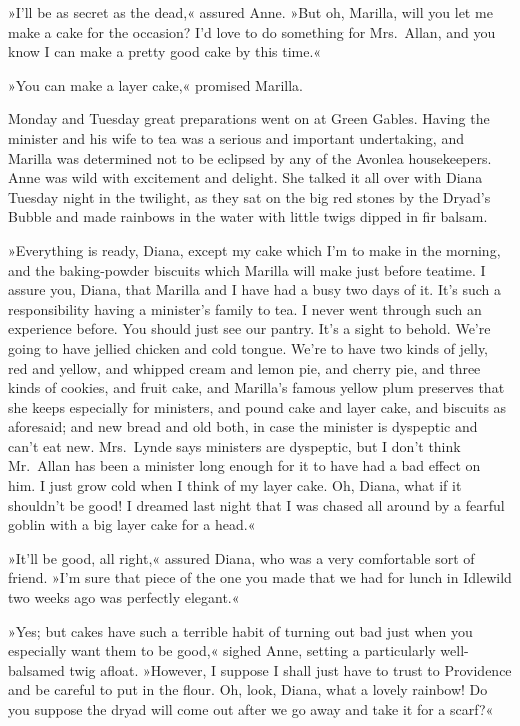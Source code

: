 »I'll be as secret as the dead,« assured Anne. »But oh, Marilla, will you let me make a cake for the occasion? I'd love to do something for Mrs.~Allan, and you know I can make a pretty good cake by this time.«

»You can make a layer cake,« promised Marilla.

Monday and Tuesday great preparations went on at Green Gables. Having the minister and his wife to tea was a serious and important undertaking, and Marilla was determined not to be eclipsed by any of the Avonlea housekeepers. Anne was wild with excitement and delight. She talked it all over with Diana Tuesday night in the twilight, as they sat on the big red stones by the Dryad's Bubble and made rainbows in the water with little twigs dipped in fir balsam.

»Everything is ready, Diana, except my cake which I'm to make in the morning, and the baking-powder biscuits which Marilla will make just before teatime. I assure you, Diana, that Marilla and I have had a busy two days of it. It's such a responsibility having a minister's family to tea. I never went through such an experience before. You should just see our pantry. It's a sight to behold. We're going to have jellied chicken and cold tongue. We're to have two kinds of jelly, red and yellow, and whipped cream and lemon pie, and cherry pie, and three kinds of cookies, and fruit cake, and Marilla's famous yellow plum preserves that she keeps especially for ministers, and pound cake and layer cake, and biscuits as aforesaid; and new bread and old both, in case the minister is dyspeptic and can't eat new. Mrs.~Lynde says ministers are dyspeptic, but I don't think Mr.~Allan has been a minister long enough for it to have had a bad effect on him. I just grow cold when I think of my layer cake. Oh, Diana, what if it shouldn't be good! I dreamed last night that I was chased all around by a fearful goblin with a big layer cake for a head.«

»It'll be good, all right,« assured Diana, who was a very comfortable sort of friend. »I'm sure that piece of the one you made that we had for lunch in Idlewild two weeks ago was perfectly elegant.«

»Yes; but cakes have such a terrible habit of turning out bad just when you especially want them to be good,« sighed Anne, setting a particularly well-balsamed twig afloat. »However, I suppose I shall just have to trust to Providence and be careful to put in the flour. Oh, look, Diana, what a lovely rainbow! Do you suppose the dryad will come out after we go away and take it for a scarf?«

